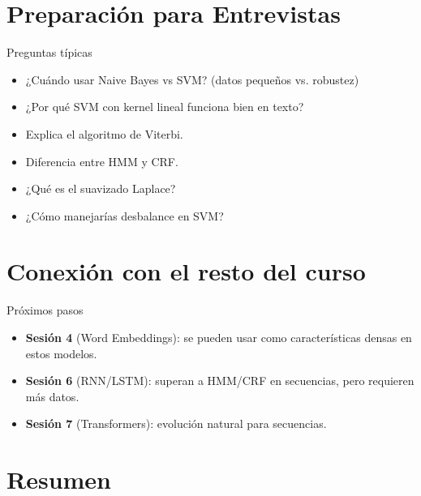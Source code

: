 \documentclass[aspectratio=169, 10pt, xcolor=table]{beamer}
\begin{document}
\section{Preparación para Entrevistas}

\begin{frame}{Preguntas típicas}
    \begin{itemize}
        \item ¿Cuándo usar Naive Bayes vs SVM? (datos pequeños vs. robustez)
        \item ¿Por qué SVM con kernel lineal funciona bien en texto?
        \item Explica el algoritmo de Viterbi.
        \item Diferencia entre HMM y CRF.
        \item ¿Qué es el suavizado Laplace?
        \item ¿Cómo manejarías desbalance en SVM?
    \end{itemize}
\end{frame}

\section{Conexión con el resto del curso}

\begin{frame}{Próximos pasos}
    \begin{itemize}
        \item \textbf{Sesión 4} (Word Embeddings): se pueden usar como características densas en estos modelos.
        \item \textbf{Sesión 6} (RNN/LSTM): superan a HMM/CRF en secuencias, pero requieren más datos.
        \item \textbf{Sesión 7} (Transformers): evolución natural para secuencias.
    \end{itemize}
\end{frame}

\section{Resumen}
\end{document}
